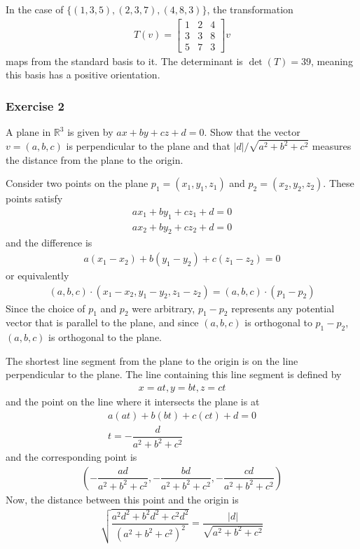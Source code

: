 \documentclass{article}
\newcommand{\R}{\mathbb{R}}
\begin{document}
	In the case of $\{(1, 3, 5), (2, 3, 7), (4, 8, 3)\}$, the transformation
	\begin{gather*}
		T \left( v \right) = \begin{bmatrix}
			1 & 2 & 4 \\
			3 & 3 & 8 \\
			5 & 7 & 3
		\end{bmatrix} v
	\end{gather*}
	maps from the standard basis to it. The determinant is $\det(T) = 39$, meaning this basis has a positive orientation.
	
	\subsubsection*{Exercise 2}
	A plane in $\R^3$ is given by $ax + by + cz + d = 0$. Show that the vector $v = (a, b, c)$ is perpendicular to the plane and that $|d|/\sqrt{a^2 + b^2 + c^2}$ measures the distance from the plane to the origin.
	
	Consider two points on the plane $p_1 = (x_1, y_1, z_1)$ and $p_2 = (x_2, y_2, z_2)$. These points satisfy
	\begin{gather*}
		ax_1 + by_1 + cz_1 + d = 0 \\
		ax_2 + by_2 + cz_2 + d = 0
	\end{gather*}
	and the difference is
	\begin{gather*}
		a(x_1 - x_2) + b(y_1 - y_2) + c(z_1 - z_2) = 0
	\end{gather*}
	or equivalently
	\begin{gather*}
		(a, b, c) \cdot (x_1 - x_2, y_1 - y_2, z_1 - z_2) = (a, b, c) \cdot (p_1 - p_2)
	\end{gather*}
	Since the choice of $p_1$ and $p_2$ were arbitrary, $p_1 - p_2$ represents any potential vector that is parallel to the plane, and since $(a, b, c)$ is orthogonal to $p_1 - p_2$, $(a, b, c)$ is orthogonal to the plane.
	
	The shortest line segment from the plane to the origin is on the line perpendicular to the plane. The line containing this line segment is defined by
	\begin{gather*}
		x = at, y = bt, z = ct
	\end{gather*}
	and the point on the line where it intersects the plane is at
	\begin{gather*}
		a(at) + b(bt) + c(ct) + d = 0 \\
		t = -\dfrac{d}{a^2 + b^2 + c^2} 
	\end{gather*}
	and the corresponding point is
	\begin{gather*}
		\left( -\dfrac{ad}{a^2 + b^2 + c^2}, -\dfrac{bd}{a^2 + b^2 + c^2}, -\dfrac{cd}{a^2 + b^2 + c^2} \right)
	\end{gather*}
	Now, the distance between this point and the origin is
	\begin{gather*}
		\sqrt{ \dfrac{a^2d^2 + b^2d^2 + c^2d^2}{(a^2 + b^2 + c^2)^2} } = \dfrac{|d|}{\sqrt{a^2 + b^2 + c^2}}
	\end{gather*}
\end{document}
